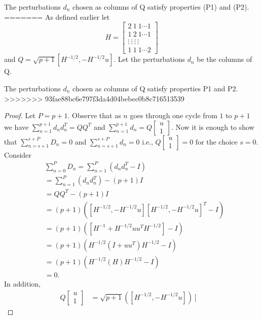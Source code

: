 \begin{lemma}
 The perturbations $d_n$ chosen as columns of Q satisfy properties (P1) and (P2).
=======
As defined earlier let \begin{equation*} H = \left[\begin{array}{cccc}
2 \ 1 \ 1 \cdots 1\\ 
1 \ 2 \ 1 \cdots 1 \\
\vdots \ \vdots \ \vdots \ \vdots\\
1 \ 1 \ 1 \cdots 2
\end{array}\right]
\end{equation*}
and $Q=\sqrt{p+1}[H^{-1/2},-H^{-1/2}u].$
Let the perturbations $d_n$ be the columns of Q. 
\begin{lemma}
 The perturbations $d_n$ chosen as columns of Q satisfy properties P1 and P2.
>>>>>>> 93fae88bc6e797f3da4d04bebec0b8c716513539
\end{lemma}
\begin{proof}
 Let $P=p+1$. Observe that as $n$ goes through one cycle from $1$ to $p+1$ we have
 $\sum\limits_{n=1}^{p+1}d_nd_n^T=QQ^T$ and 
 $\sum\limits_{n=1}^{p+1}d_n= Q\left[\begin{array}{cccc}
 u\\ 1 \end{array}\right]$.
 Now it is enough to show that
 $\sum\limits_{n=s+1}^{s+P}D_n=0$ and 
 $\sum\limits_{n=s+1}^{s+P}d_n= 0$ i.e., 
 $Q\left[\begin{array}{cccc}
 u\\ 1 \end{array}\right]=0 \text{ for the choice } s=0.$
 Consider
 \begin{align*}
 & \sum_{n=0}^{P}D_n=\sum_{n=1}^{P}(d_nd_n^T-I)\\
 & =\sum_{n=1}^{P}(d_nd_n^T)-(p+1)I\\
 & =QQ^T-(p+1)I\\
 & =(p+1)([H^{-1/2},-H^{-1/2}u][H^{-1/2},-H^{-1/2}u]^T-I)\\
 & =(p+1)([H^{-1}+H^{-1/2}uu^TH^{-1/2}]-I)\\
 & =(p+1)(H^{-1/2}(I+uu^T)H^{-1/2}-I)\\
 & =(p+1)(H^{-1/2}(H)H^{-1/2}-I)\\
 & = 0.
 \end{align*}
 In addition,
 \begin{align*}
 Q\left[\begin{array}{cccc}
 u\\ 1 \end{array}\right]
 & = \sqrt{p+1}([H^{-1/2},-H^{-1/2}u]) \left[\begin{array}{cccc}

\end{array}
\end{align*}
\end{proof}
\end{lemma}
